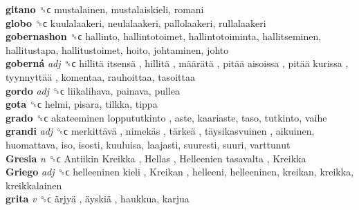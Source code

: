 \textbf{gitano} ␝ϲ  mustalainen, mustalaiskieli, romani  \\
\textbf{globo} ␝ϲ  kuulalaakeri, neulalaakeri, pallolaakeri, rullalaakeri  \\
\textbf{gobernashon} ␝ϲ  hallinto, hallintotoimet, hallintotoiminta, hallitseminen, hallitustapa, hallitustoimet, hoito, johtaminen, johto  \\
\textbf{goberná} \emph{adj}  ␝ϲ   hillitä itsensä ,  hillitä ,  määrätä ,  pitää aisoissa ,  pitää kurissa ,  tyynnyttää , komentaa, rauhoittaa, tasoittaa  \\
\textbf{gordo} \emph{adj}  ␝ϲ  liikalihava, painava, pullea  \\
\textbf{gota} ␝ϲ  helmi, pisara, tilkka, tippa  \\
\textbf{grado} ␝ϲ   akateeminen loppututkinto , aste, kaariaste, taso, tutkinto, vaihe  \\
\textbf{grandi} \emph{adj}  ␝ϲ   merkittävä ,  nimekäs ,  tärkeä ,  täysikasvuinen , aikuinen, huomattava, iso, isosti, kuuluisa, laajasti, suuresti, suuri, varttunut  \\
\textbf{Gresia} \emph{n}  ␝ϲ   Antiikin Kreikka ,  Hellas ,  Helleenien tasavalta ,  Kreikka   \\
\textbf{Griego} \emph{adj}  ␝ϲ   helleeninen kieli ,  Kreikan , helleeni, helleeninen, kreikan, kreikka, kreikkalainen  \\
\textbf{grita} \emph{v}  ␝ϲ   ärjyä ,  äyskiä , haukkua, karjua  \\
